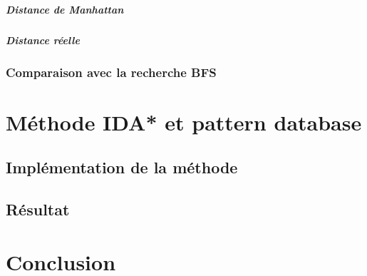 \documentclass{article}
\begin{document}
\paragraph{}
\subparagraph{Distance de Manhattan}
\subparagraph{Distance réelle}
\subsubsection{Comparaison avec la recherche BFS}
\paragraph{}

\section{Méthode IDA* et pattern database}
\subsection{Implémentation de la méthode}
\paragraph{}
\subsection{Résultat}
\paragraph{}

\section{Conclusion}
\paragraph{}
\end{document}
